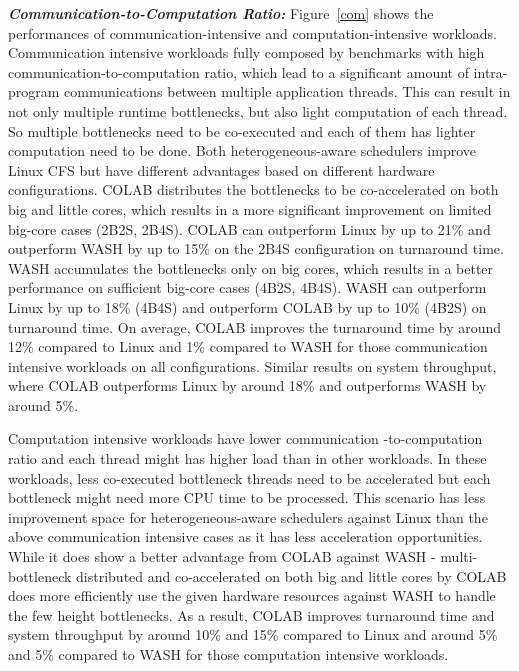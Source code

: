 \textbf{\textit{Communication-to-Computation Ratio:}}
Figure~\ref{com} shows the performances of communication-intensive and computation-intensive workloads. 
Communication intensive workloads fully composed by benchmarks with high communication-to-computation ratio, which lead to a significant amount of intra-program communications between multiple application threads. This can result in not only multiple runtime bottlenecks, but also light computation of each thread. So multiple bottlenecks need to be co-executed and each of them has lighter computation need to be done.
Both heterogeneous-aware schedulers improve Linux CFS but have different advantages based on different hardware configurations. COLAB distributes the bottlenecks to be co-accelerated on both big and little cores, which results in a more significant improvement on limited big-core cases (2B2S, 2B4S). COLAB can outperform  Linux by up to 21\% and outperform WASH by up to 15\% on the 2B4S configuration on turnaround time. WASH accumulates the bottlenecks only on big cores, which results in a better performance on sufficient big-core cases (4B2S, 4B4S). WASH can outperform Linux by up to 18\% (4B4S) and outperform COLAB by up to 10\% (4B2S) on turnaround time. On average, COLAB improves the turnaround time by around 12\% compared to Linux and 1\% compared to WASH for those communication intensive workloads on all configurations. Similar results on system throughput, where COLAB outperforms Linux by around 18\% and outperforms WASH by around 5\%.

Computation intensive workloads have lower communication -to-computation ratio and each thread might has higher load than in other workloads. In these workloads, less co-executed bottleneck threads need to be accelerated but each bottleneck might need more CPU time to be processed. This scenario has less improvement space for heterogeneous-aware schedulers against Linux than the above communication intensive cases as it has less acceleration opportunities. While it does show a better advantage from COLAB against WASH - multi-bottleneck distributed and co-accelerated on both big and little cores by COLAB does more efficiently use the given hardware resources against WASH to handle the few height bottlenecks. As a result, COLAB improves turnaround time and system throughput by around 10\% and 15\% compared to Linux and around 5\% and 5\% compared to WASH for those computation intensive workloads.

